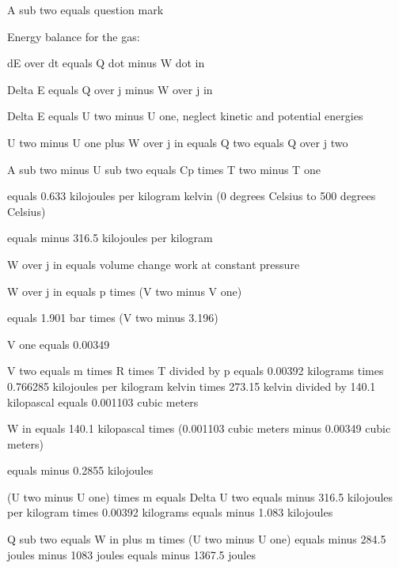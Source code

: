 A sub two equals question mark

Energy balance for the gas:

dE over dt equals Q dot minus W dot in

Delta E equals Q over j minus W over j in

Delta E equals U two minus U one, neglect kinetic and potential energies

U two minus U one plus W over j in equals Q two equals Q over j two

A sub two minus U sub two equals Cp times T two minus T one

equals 0.633 kilojoules per kilogram kelvin (0 degrees Celsius to 500 degrees Celsius)

equals minus 316.5 kilojoules per kilogram

W over j in equals volume change work at constant pressure

W over j in equals p times (V two minus V one)

equals 1.901 bar times (V two minus 3.196)

V one equals 0.00349

V two equals m times R times T divided by p equals 0.00392 kilograms times 0.766285 kilojoules per kilogram kelvin times 273.15 kelvin divided by 140.1 kilopascal equals 0.001103 cubic meters

W in equals 140.1 kilopascal times (0.001103 cubic meters minus 0.00349 cubic meters)

equals minus 0.2855 kilojoules

(U two minus U one) times m equals Delta U two equals minus 316.5 kilojoules per kilogram times 0.00392 kilograms equals minus 1.083 kilojoules

Q sub two equals W in plus m times (U two minus U one) equals minus 284.5 joules minus 1083 joules equals minus 1367.5 joules